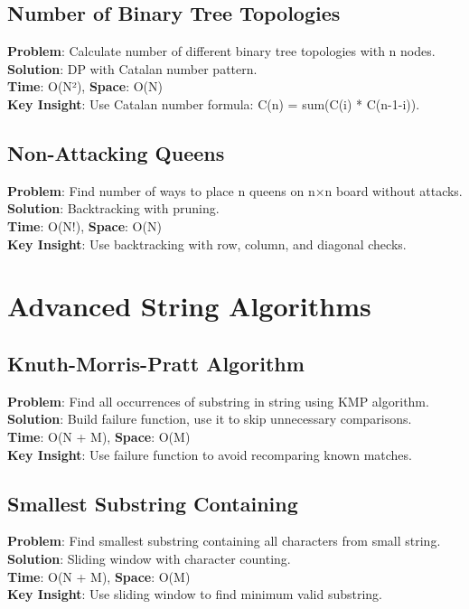 \documentclass{report}
\begin{document}
\subsection{Number of Binary Tree Topologies}
\textbf{Problem}: Calculate number of different binary tree topologies with n nodes.\\
\textbf{Solution}: DP with Catalan number pattern.\\
\textbf{Time}: O(N²), \textbf{Space}: O(N)\\
\textbf{Key Insight}: Use Catalan number formula: C(n) = sum(C(i) * C(n-1-i)).

\subsection{Non-Attacking Queens}
\textbf{Problem}: Find number of ways to place n queens on n×n board without attacks.\\
\textbf{Solution}: Backtracking with pruning.\\
\textbf{Time}: O(N!), \textbf{Space}: O(N)\\
\textbf{Key Insight}: Use backtracking with row, column, and diagonal checks.

\section{Advanced String Algorithms}

\subsection{Knuth-Morris-Pratt Algorithm}
\textbf{Problem}: Find all occurrences of substring in string using KMP algorithm.\\
\textbf{Solution}: Build failure function, use it to skip unnecessary comparisons.\\
\textbf{Time}: O(N + M), \textbf{Space}: O(M)\\
\textbf{Key Insight}: Use failure function to avoid recomparing known matches.

\subsection{Smallest Substring Containing}
\textbf{Problem}: Find smallest substring containing all characters from small string.\\
\textbf{Solution}: Sliding window with character counting.\\
\textbf{Time}: O(N + M), \textbf{Space}: O(M)\\
\textbf{Key Insight}: Use sliding window to find minimum valid substring.
\end{document}
